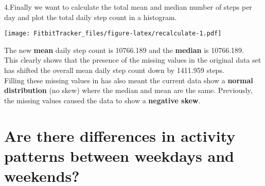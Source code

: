 \documentclass[]{article}
\newenvironment{Shaded}{\begin{snugshade}}{\end{snugshade}}
\newcommand{\KeywordTok}[1]{\textcolor[rgb]{0.13,0.29,0.53}{\textbf{{#1}}}}
\newcommand{\DataTypeTok}[1]{\textcolor[rgb]{0.13,0.29,0.53}{{#1}}}
\newcommand{\DecValTok}[1]{\textcolor[rgb]{0.00,0.00,0.81}{{#1}}}
\newcommand{\StringTok}[1]{\textcolor[rgb]{0.31,0.60,0.02}{{#1}}}
\newcommand{\CommentTok}[1]{\textcolor[rgb]{0.56,0.35,0.01}{\textit{{#1}}}}
\newcommand{\OtherTok}[1]{\textcolor[rgb]{0.56,0.35,0.01}{{#1}}}
\newcommand{\NormalTok}[1]{{#1}}
\begin{document}
4.Finally we want to calculate the total mean and median number of steps
per day and plot the total daily step count in a histogram.

\begin{Shaded}
\end{Shaded}

\texttt{[image: FitbitTracker\_files/figure-latex/recalculate-1.pdf]}

The new \textbf{mean} daily step count is 10766.189 and the
\textbf{median} is 10766.189.\\
This clearly shows that the presence of the missing values in the
original data set has shifted the overall mean daily step count down by
1411.959 steps.\\
Filling these missing values in has also meant the current data show a
\textbf{normal distribution} (no skew) where the median and mean are the
same. Previously, the missing values caused the data to show a
\textbf{negative skew}.

\section{Are there differences in activity patterns between weekdays and
weekends?}\label{are-there-differences-in-activity-patterns-between-weekdays-and-weekends}
\end{document}
